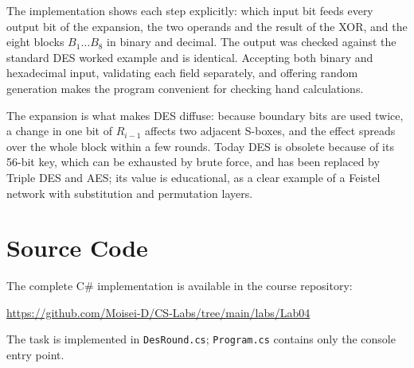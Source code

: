 \documentclass[12pt,a4paper]{article}
\begin{document}
The implementation shows each step explicitly: which input bit feeds every output bit of the expansion, the two operands and the result of the XOR, and the eight blocks $B_1\ldots B_8$ in binary and decimal. The output was checked against the standard DES worked example and is identical. Accepting both binary and hexadecimal input, validating each field separately, and offering random generation makes the program convenient for checking hand calculations.

The expansion is what makes DES diffuse: because boundary bits are used twice, a change in one bit of $R_{i-1}$ affects two adjacent S-boxes, and the effect spreads over the whole block within a few rounds. Today DES is obsolete because of its 56-bit key, which can be exhausted by brute force, and has been replaced by Triple DES and AES; its value is educational, as a clear example of a Feistel network with substitution and permutation layers.

\section{Source Code}

The complete C\# implementation is available in the course repository:

\begin{center}
  \url{https://github.com/Moisei-D/CS-Labs/tree/main/labs/Lab04}
\end{center}

The task is implemented in \texttt{DesRound.cs}; \texttt{Program.cs} contains only the console entry point.
\end{document}
